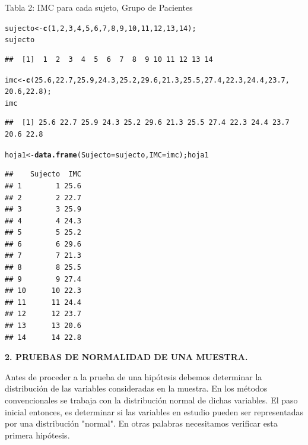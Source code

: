 \documentclass[12pt,letterpaper]{article}\usepackage[]{graphicx}\usepackage[]{color}
\makeatletter
\newcommand{\hlnum}[1]{\textcolor[rgb]{0.686,0.059,0.569}{#1}}%
\newcommand{\hlstd}[1]{\textcolor[rgb]{0.345,0.345,0.345}{#1}}%
\newcommand{\hlkwb}[1]{\textcolor[rgb]{0.69,0.353,0.396}{#1}}%
\newcommand{\hlkwc}[1]{\textcolor[rgb]{0.333,0.667,0.333}{#1}}%
\newcommand{\hlkwd}[1]{\textcolor[rgb]{0.737,0.353,0.396}{\textbf{#1}}}%
\newenvironment{kframe}{%
 \def\at@end@of@kframe{}%
 \ifinner\ifhmode%
  \def\at@end@of@kframe{\end{minipage}}%
  \begin{minipage}{\columnwidth}%
 \fi\fi%
 \def\FrameCommand##1{\hskip\@totalleftmargin \hskip-\fboxsep
 \colorbox{shadecolor}{##1}\hskip-\fboxsep
     \hskip-\linewidth \hskip-\@totalleftmargin \hskip\columnwidth}%
 \MakeFramed {\advance\hsize-\width
   \@totalleftmargin\z@ \linewidth\hsize
   \@setminipage}}%
 {\par\unskip\endMakeFramed%
 \at@end@of@kframe}
\newenvironment{knitrout}{}{} %
\makeatother
\begin{document}
Tabla 2: IMC para cada sujeto, Grupo de Pacientes
\begin{knitrout}
\color{fgcolor}\begin{kframe}
\begin{alltt}
\hlstd{sujecto} \hlkwb{<-} \hlkwd{c}\hlstd{(}\hlnum{1}\hlstd{,} \hlnum{2}\hlstd{,} \hlnum{3}\hlstd{,} \hlnum{4}\hlstd{,} \hlnum{5}\hlstd{,} \hlnum{6}\hlstd{,} \hlnum{7}\hlstd{,} \hlnum{8}\hlstd{,} \hlnum{9}\hlstd{,} \hlnum{10}\hlstd{,} \hlnum{11}\hlstd{,} \hlnum{12}\hlstd{,} \hlnum{13}\hlstd{,} \hlnum{14}\hlstd{);}
\hlstd{sujecto}
\end{alltt}
\begin{verbatim}
##  [1]  1  2  3  4  5  6  7  8  9 10 11 12 13 14
\end{verbatim}
\begin{alltt}
\hlstd{imc} \hlkwb{<-} \hlkwd{c}\hlstd{(}\hlnum{25.6}\hlstd{,} \hlnum{22.7}\hlstd{,} \hlnum{25.9}\hlstd{,} \hlnum{24.3}\hlstd{,} \hlnum{25.2}\hlstd{,} \hlnum{29.6}\hlstd{,} \hlnum{21.3}\hlstd{,} \hlnum{25.5}\hlstd{,} \hlnum{27.4}\hlstd{,} \hlnum{22.3}\hlstd{,} \hlnum{24.4}\hlstd{,} \hlnum{23.7}\hlstd{,}
         \hlnum{20.6}\hlstd{,} \hlnum{22.8}\hlstd{);}
\hlstd{imc}
\end{alltt}
\begin{verbatim}
##  [1] 25.6 22.7 25.9 24.3 25.2 29.6 21.3 25.5 27.4 22.3 24.4 23.7 20.6 22.8
\end{verbatim}
\begin{alltt}
\hlstd{hoja1} \hlkwb{<-} \hlkwd{data.frame}\hlstd{(}\hlkwc{Sujecto}\hlstd{=sujecto,} \hlkwc{IMC}\hlstd{=imc); hoja1}
\end{alltt}
\begin{verbatim}
##    Sujecto  IMC
## 1        1 25.6
## 2        2 22.7
## 3        3 25.9
## 4        4 24.3
## 5        5 25.2
## 6        6 29.6
## 7        7 21.3
## 8        8 25.5
## 9        9 27.4
## 10      10 22.3
## 11      11 24.4
## 12      12 23.7
## 13      13 20.6
## 14      14 22.8
\end{verbatim}
\end{kframe}
\end{knitrout}

\begin{center}
\textbf{2.  PRUEBAS DE NORMALIDAD DE UNA MUESTRA.}
\end{center}

Antes de proceder a la prueba de una hip\'otesis debemos determinar la distribuci\'on de las variables consideradas en la muestra. En los m\'etodos convencionales se trabaja con la distribuci\'on normal de dichas variables. El paso inicial entonces, es determinar si las variables en estudio pueden ser representadas por una distribuci\'on "normal". En otras palabras necesitamos verificar esta primera hip\'otesis.\\
\end{document}
